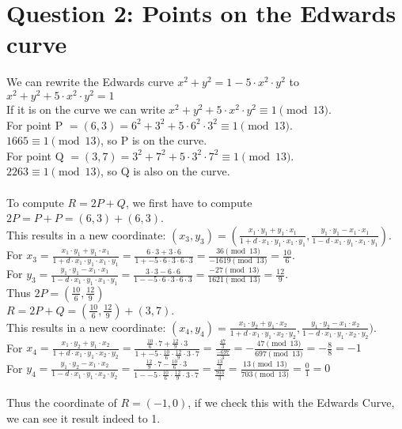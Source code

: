 \documentclass{article}
\begin{document}
\section{Question 2: Points on the Edwards curve}
We can rewrite the Edwards curve $x^2 + y^2 = 1-5 \cdot x^2 \cdot y^2$ to $x^2 + y^2 + 5 \cdot x^2 \cdot y^2 = 1$
\\If it is on the curve we can write $x^2 + y^2 + 5 \cdot x^2 \cdot y^2 \equiv 1 \pmod{13}$.
\\For point P $=(6,3) = 6^2 + 3^2 + 5 \cdot 6^2 \cdot 3^2 \equiv 1 \pmod{13}$.
\\$1665 \equiv 1 \pmod{13}$, so P is on the curve.
\\For point Q $=(3,7) = 3^2 + 7^2 + 5 \cdot 3^2 \cdot 7^2 \equiv 1 \pmod{13}$.
\\$2263 \equiv 1 \pmod{13}$, so Q is also on the curve.
\\\\
To compute $R = 2P + Q$, we first have to compute $2P = P + P = (6,3) + (6,3)$. 
\\This results in a new coordinate: $(x_3, y_3) = (\frac{x_1 \cdot y_1 + y_1 \cdot x_1}{1 + d \cdot x_1 \cdot y_1 \cdot x_1 \cdot y_1}, \frac{y_1 \cdot y_1 - x_1 \cdot x_1}{1-d\cdot x_1 \cdot y_1 \cdot x_1 \cdot y_1})$.
\\For $x_3 = \frac{x_1 \cdot y_1 + y_1 \cdot x_1}{1 + d \cdot x_1 \cdot y_1 \cdot x_1 \cdot y_1} = \frac{6 \cdot 3 + 3 \cdot 6}{1 + -5 \cdot 6 \cdot 3 \cdot 6 \cdot 3} = \frac{36 \pmod{13}}{-1619 \pmod{13}} = \frac{10}{6}$.
\\For $y_3 = \frac{y_1 \cdot y_1 - x_1 \cdot x_1}{1-d\cdot x_1 \cdot y_1 \cdot x_1 \cdot y_1} = \frac{3 \cdot 3 - 6 \cdot 6}{1--5\cdot 6 \cdot 3 \cdot 6 \cdot 3} = \frac{-27 \pmod{13}}{1621 \pmod{13}} = \frac{12}{9}$.
\\Thus $2P = (\frac{10}{6}, \frac{12}{9})$
\\$R = 2P + Q = (\frac{10}{6}, \frac{12}{9}) + (3,7)$.
\\This results in a new coordinate: $(x_4, y_4) = \frac{x_1 \cdot y_2 + y_1 \cdot x_2}{1 + d \cdot x_1 \cdot y_1 \cdot x_2 \cdot y_2}, \frac{y_1 \cdot y_2 - x_1 \cdot x_2}{1-d\cdot x_1 \cdot y_1 \cdot x_2 \cdot y_2})$.
\\For $x_4 = \frac{x_1 \cdot y_2 + y_1 \cdot x_2}{1 + d \cdot x_1 \cdot y_1 \cdot x_2 \cdot y_2} = \frac{\frac{10}{6} \cdot 7 + \frac{12}{9} \cdot 3}{1 + -5 \cdot \frac{10}{6} \cdot \frac{12}{9} \cdot 3 \cdot 7} = \frac{\frac{47}{3}}{\frac{-697}{3}} = -\frac{47 \pmod{13}}{697 \pmod{13}} = - \frac{8}{8} = -1$
\\For $y_4 = \frac{y_1 \cdot y_2 - x_1 \cdot x_2}{1-d\cdot x_1 \cdot y_1 \cdot x_2 \cdot y_2} = \frac{\frac{12}{9} \cdot 7 - \frac{10}{6} \cdot 3}{1--5\cdot \frac{10}{6} \cdot \frac{12}{9} \cdot 3 \cdot 7} = \frac{\frac{13}{3}}{\frac{703}{3}} = \frac{13 \pmod{13}}{703 \pmod{13}} = \frac{0}{1} = 0$
\\
\\Thus the coordinate of $R = (-1,0)$, if we check this with the Edwards Curve, we can see it result indeed to 1.
\end{document}
